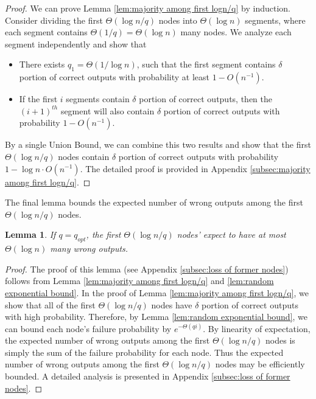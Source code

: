 \documentclass[a4paper,UKenglish]{lipics}
\newtheorem{lem}[thm]{Lemma}
\theoremstyle{definition}
\begin{document}
\begin{proof}
We can prove Lemma \ref{lem:majority among first logn/q} by induction.
Consider dividing the first $\Theta(\log n/q)$ nodes into $\Theta(\log n)$ segments, 
	where each segment contains $\Theta(1/q) = \Theta(\log n)$ many nodes.
We analyze each segment independently and show that 
\begin{itemize}
\item There exists $q_1 = \Theta(1/\log n)$, 
		such that the first segment contains $\delta$ portion of correct outputs with probability at least $1 - O(n^{-1})$.
\item If the first $i$ segments contain $\delta$ portion of correct outputs,
		then the $(i+1)^{th}$ segment will also contain $\delta$ portion of correct outputs with probability $1 - O(n^{-1})$.
\end{itemize}
By a single Union Bound, we can combine this two results and show that
	the first $\Theta(\log n/q)$ nodes contain $\delta$ portion of correct outputs with probability $1 - \log n\cdot O(n^{-1})$.
The detailed proof is provided in Appendix \ref{subsec:majority among first logn/q}.
\end{proof}

The final lemma bounds the expected number of wrong outputs among the first $\Theta(\log n / q)$ nodes.

\begin{lem}
\label{lem:loss of former nodes}
If $q = q_{opt}$, the first $\Theta(\log n/q)$ nodes' expect to have at most $\Theta(\log n)$ many wrong outputs.
\end{lem}
\begin{proof}
The proof of this lemma (see Appendix \ref{subsec:loss of former nodes}) follows from Lemma \ref{lem:majority among first logn/q} and \ref{lem:random exponential bound}.
In the proof of Lemma \ref{lem:majority among first logn/q},
	we show that all of the first $\Theta(\log n/q)$ nodes have $\delta$ portion of correct outputs with high probability.
Therefore, by Lemma \ref{lem:random exponential bound},
	we can bound each node's failure probability by $e^{-\Theta(qi)}$.
By linearity of expectation, the expected number of wrong outputs among the first $\Theta(\log n/q)$ nodes 
	is simply the sum of the failure probability for each node. 
Thus the expected number of wrong outputs among the first $\Theta(\log n/q)$ nodes may be efficiently bounded.
A detailed analysis is presented in Appendix \ref{subsec:loss of former nodes}.
\end{proof}
\end{document}
